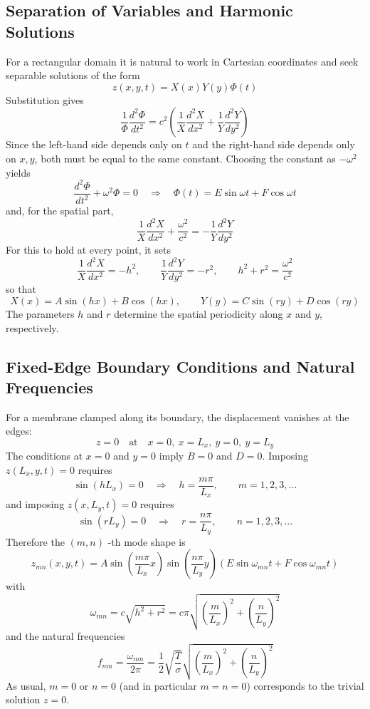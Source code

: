 \subsection{Separation of Variables and Harmonic Solutions}

For a rectangular domain it is natural to work in Cartesian coordinates and seek separable solutions of the form
\[
z(x,y,t) = X(x)Y(y)\Phi(t)
\]
Substitution gives
\[
\frac{1}{\Phi}\frac{d^{2}\Phi}{dt^{2}}
 = 
c^{2}\left(
\frac{1}{X}\frac{d^{2}X}{dx^{2}}
+
\frac{1}{Y}\frac{d^{2}Y}{dy^{2}}
\right)
\]
Since the left-hand side depends only on \( t \) and the right-hand side depends only on \( x,y \), both must be equal to the same constant. Choosing the constant as \( -\omega^{2} \) yields
\[
\frac{d^{2}\Phi}{dt^{2}}+\omega^{2}\Phi = 0
\quad\Rightarrow\quad
\Phi(t) = E\sin\omega t+F\cos\omega t
\]
and, for the spatial part,
\[
\frac{1}{X}\frac{d^{2}X}{dx^{2}}+\frac{\omega^{2}}{c^{2}}
 = 
-\frac{1}{Y}\frac{d^{2}Y}{dy^{2}}
\]
For this to hold at every point, it sets
\[
\frac{1}{X}\frac{d^{2}X}{dx^{2}} = -h^{2},
\qquad
\frac{1}{Y}\frac{d^{2}Y}{dy^{2}} = -r^{2},
\qquad
h^{2}+r^{2} = \frac{\omega^{2}}{c^{2}}
\]
so that
\[
X(x) = A\sin(hx)+B\cos(hx),
\qquad
Y(y) = C\sin(ry)+D\cos(ry)
\]
The parameters \( h \) and \( r \) determine the spatial periodicity along \( x \) and \( y \), respectively. 

\subsection{Fixed-Edge Boundary Conditions and Natural Frequencies}

For a membrane clamped along its boundary, the displacement vanishes at the edges:
\[
z = 0 \quad \text{at} \quad x = 0,\ x = L_x,\ y = 0,\ y = L_y
\]
The conditions at \( x = 0 \) and \( y = 0 \) imply \( B = 0 \) and \( D = 0 \). Imposing \( z(L_x,y,t) = 0 \) requires
\[
\sin(hL_x) = 0 \quad\Rightarrow\quad h = \frac{m\pi}{L_x},
\qquad m = 1,2,3,\dots
\]
and imposing \( z(x,L_y,t) = 0 \) requires
\[
\sin(rL_y) = 0 \quad\Rightarrow\quad r = \frac{n\pi}{L_y},
\qquad n = 1,2,3,\dots
\]
Therefore the \( (m,n) \) -th mode shape is
\[
z_{mn}(x,y,t) = A\sin\left(\frac{m\pi}{L_x}x\right)\sin\left(\frac{n\pi}{L_y}y\right)
\left(E\sin\omega_{mn}t+F\cos\omega_{mn}t\right)
\]
with
\[
\omega_{mn} = c\sqrt{h^{2}+r^{2}}
 = 
c\pi\sqrt{\left(\frac{m}{L_x}\right)^{2}+\left(\frac{n}{L_y}\right)^{2}}
\]
and the natural frequencies
\[
f_{mn} = \frac{\omega_{mn}}{2\pi}
 = 
\frac{1}{2}\sqrt{\frac{T}{\sigma}}
\sqrt{\left(\frac{m}{L_x}\right)^{2}+\left(\frac{n}{L_y}\right)^{2}}
\]
As usual, \( m = 0 \) or \( n = 0 \) (and in particular \( m = n = 0 \)) corresponds to the trivial solution \( z = 0 \).

